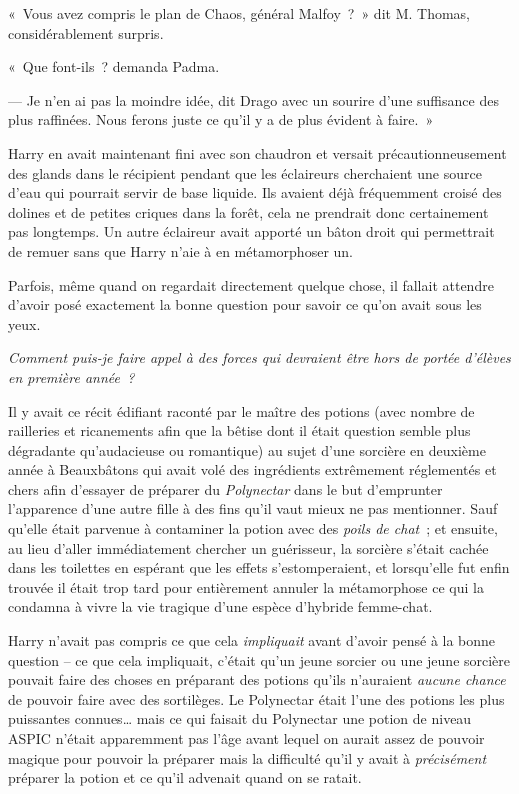 «~Vous avez compris le plan de Chaos, général Malfoy~?~» dit M. Thomas, considérablement surpris.

«~Que font-ils~? demanda Padma.

--- Je n'en ai pas la moindre idée, dit Drago avec un sourire d'une suffisance des plus raffinées. Nous ferons juste ce qu'il y a de plus évident à faire.~»

\later

Harry en avait maintenant fini avec son chaudron et versait précautionneusement des glands dans le récipient pendant que les éclaireurs cherchaient une source d'eau qui pourrait servir de base liquide. Ils avaient déjà fréquemment croisé des dolines et de petites criques dans la forêt, cela ne prendrait donc certainement pas longtemps. Un autre éclaireur avait apporté un bâton droit qui permettrait de remuer sans que Harry n'aie à en métamorphoser un.

Parfois, même quand on regardait directement quelque chose, il fallait attendre d'avoir posé exactement la bonne question pour savoir ce qu'on avait sous les yeux.

\emph{Comment puis-je faire appel à des forces qui devraient être hors de portée d'élèves en première année~?}

Il y avait ce récit édifiant raconté par le maître des potions (avec nombre de railleries et ricanements afin que la bêtise dont il était question semble plus dégradante qu'audacieuse ou romantique) au sujet d'une sorcière en deuxième année à Beauxbâtons qui avait volé des ingrédients extrêmement réglementés et chers afin d'essayer de préparer du \emph{Polynectar} dans le but d'emprunter l'apparence d'une autre fille à des fins qu'il vaut mieux ne pas mentionner. Sauf qu'elle était parvenue à contaminer la potion avec des \emph{poils de chat}~; et ensuite, au lieu d'aller immédiatement chercher un guérisseur, la sorcière s'était cachée dans les toilettes en espérant que les effets s'estomperaient, et lorsqu'elle fut enfin trouvée il était trop tard pour entièrement annuler la métamorphose ce qui la condamna à vivre la vie tragique d'une espèce d'hybride femme-chat.

Harry n'avait pas compris ce que cela \emph{impliquait} avant d'avoir pensé à la bonne question -- ce que cela impliquait, c'était qu'un jeune sorcier ou une jeune sorcière pouvait faire des choses en préparant des potions qu'ils n'auraient \emph{aucune chance} de pouvoir faire avec des sortilèges. Le Polynectar était l'une des potions les plus puissantes connues… mais ce qui faisait du Polynectar une potion de niveau ASPIC n'était apparemment pas l'âge avant lequel on aurait assez de pouvoir magique pour pouvoir la préparer mais la difficulté qu'il y avait à \emph{précisément} préparer la potion et ce qu'il advenait quand on se ratait.

